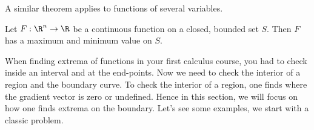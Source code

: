 \documentclass{ximera}
\begin{document}
\begin{theorem}
\begin{image}
\end{image}
\end{theorem}

A similar theorem applies to functions of several variables.

\begin{theorem}
  Let $F:\R^n\to\R$ be a continuous function on a closed, bounded set
  $S$. Then $F$ has a maximum and minimum value on $S$.
\end{theorem}

When finding extrema of functions in your first calculus course, you
had to check inside an interval and at the end-points. Now we need to
check the interior of a region and the boundary curve. To check the
interior of a region, one finds where the gradient vector is zero or
undefined. Hence in this section, we will focus on how one finds
extrema on the boundary.  Let's see some examples, we start with a classic problem.
\end{document}
